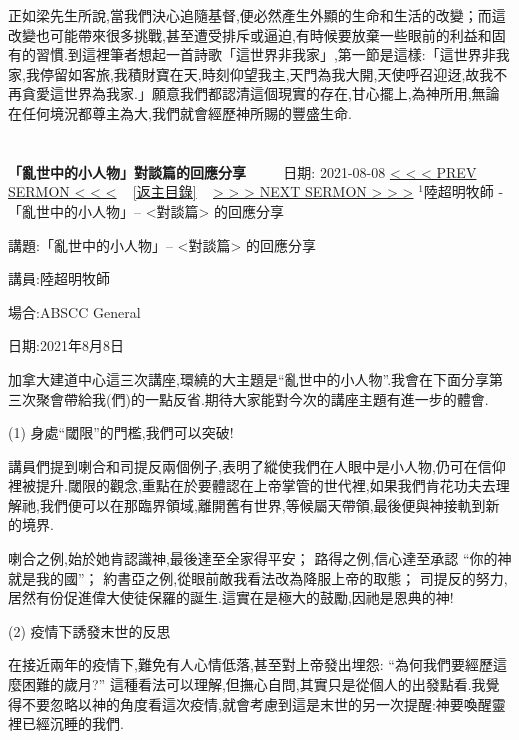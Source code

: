 \documentclass{book}
\begin{document}
正如梁先生所說,當我們決心追隨基督,便必然產生外顯的生命和生活的改變；而這改變也可能帶來很多挑戰,甚至遭受排斥或逼迫,有時候要放棄一些眼前的利益和固有的習慣.到這裡筆者想起一首詩歌「這世界非我家」,第一節是這樣:「這世界非我家,我停留如客旅,我積財寶在天,時刻仰望我主,天門為我大開,天使呼召迎迓,故我不再貪愛這世界為我家.」願意我們都認清這個現實的存在,甘心擺上,為神所用,無論在任何境況都尊主為大,我們就會經歷神所賜的豐盛生命.
\newpage



\section{}
\label{sec:5}
\textbf{「亂世中的小人物」對談篇的回應分享}
\newline
\newline
~~~~ 日期: 2021-08-08
\newline
\newline
\hyperref[sec:4]{\small{< < < PREV SERMON < < <}}
~
\hyperref[sec:index]{\small{[返主目錄]}}
~
\hyperref[sec:GA78znQ7bg4]{\small{> > > NEXT SERMON > > >}}
\newline
\newline
$^{1}$陸超明牧師 - 「亂世中的小人物」-- <對談篇> 的回應分享

講題:「亂世中的小人物」-- <對談篇> 的回應分享

講員:陸超明牧師

場合:ABSCC General

日期:2021年8月8日

加拿大建道中心這三次講座,環繞的大主題是“亂世中的小人物”.我會在下面分享第三次聚會帶給我(們)的一點反省.期待大家能對今次的講座主題有進一步的體會.

(1) 身處“閾限”的門檻,我們可以突破!

講員們提到喇合和司提反兩個例子,表明了縱使我們在人眼中是小人物,仍可在信仰裡被提升.閾限的觀念,重點在於要體認在上帝掌管的世代裡,如果我們肯花功夫去理解祂,我們便可以在那臨界領域,離開舊有世界,等候屬天帶領,最後便與神接軌到新的境界.

喇合之例,始於她肯認識神,最後達至全家得平安； 路得之例,信心達至承認 “你的神就是我的國”； 約書亞之例,從眼前敵我看法改為降服上帝的取態； 司提反的努力,居然有份促進偉大使徒保羅的誕生.這實在是極大的鼓勵,因祂是恩典的神!

(2) 疫情下誘發末世的反思

在接近兩年的疫情下,難免有人心情低落,甚至對上帝發出埋怨: “為何我們要經歷這麼困難的歲月?” 這種看法可以理解,但撫心自問,其實只是從個人的出發點看.我覺得不要忽略以神的角度看這次疫情,就會考慮到這是末世的另一次提醒:神要喚醒靈裡已經沉睡的我們.
\end{document}
